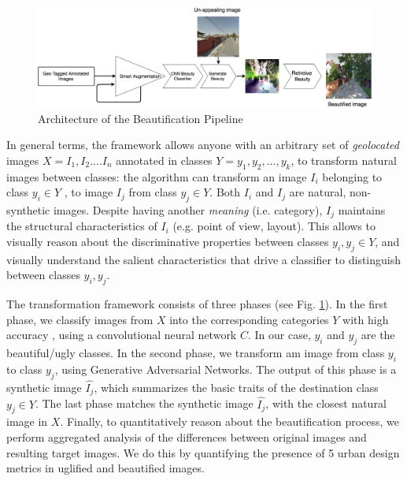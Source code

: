  \begin{figure}[ht]
	\centering
	\includegraphics[width=2\columnwidth]{Plot/UrbanEmotionsPipeline.png}
	\caption{Architecture of the Beautification Pipeline}
	\label{fig:pipeline}
\end{figure}

In general terms, the framework allows anyone with an arbitrary set of \emph{geolocated} images $ X = { I_1, I_2 ... . I_n  }$ annotated in classes $Y = {y_1 , y_2 , ... ,y_k}$, to transform natural images between classes: the algorithm can transform an  image $I_i$ belonging to class $y_i \in Y$ , to image $I_j$ from class $y_j \in Y$. Both $I_i$ and $I_j$ are natural, non-synthetic images. Despite having another \emph{meaning} (i.e. category), $I_j$ maintains the structural characteristics of $I_i$ (e.g. point of view, layout).  This allows  to visually reason about the discriminative properties between classes $y_i , y_j \in Y$, and visually understand the salient characteristics that drive a classifier to distinguish between  classes $y_i,y_j$. %
\par 
The transformation framework consists of three phases (see Fig. \ref{fig:pipeline}). In the first phase, we classify images from $X$ into the corresponding categories $Y$ with high accuracy , using a convolutional neural network $C$. In our case, $y_i$  and  $y_j$ are the beautiful/ugly classes.
In the second phase, we transform am image from class $y_i$ to class $y_j$, using Generative Adversarial Networks\cite{radford2015unsupervised}. The output of this phase is a synthetic image $\hat{I_j}$, which summarizes the basic traits of the destination class $y_j \in Y$. The last phase matches the synthetic image $\hat{I_j}$,  with the closest natural image in $X$. Finally, to quantitatively reason about the beautification process, we perform aggregated analysis of the differences between original images and resulting target images.%
We do this by quantifying the presence of 5 urban design metrics in uglified and beautified images.

